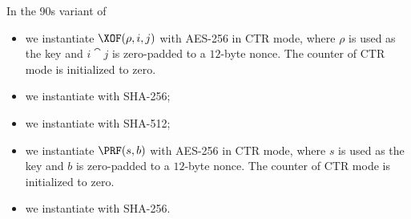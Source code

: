 In the 90s variant of \Kyber
\begin{itemize}
  \item we instantiate $\XOF(\rho,i,j)$ with AES-256 in CTR mode, where $\rho$ is used as the key and $i\cat j$ is zero-padded to a $12$-byte nonce.
    The counter of CTR mode is initialized to zero.
  \item we instantiate \ROH with SHA-256;
  \item we instantiate \ROG with SHA-512;
  \item we instantiate $\PRF(s,b)$ with AES-256 in CTR mode, where $s$ is used as the key and $b$ is zero-padded to a $12$-byte nonce.
    The counter of CTR mode is initialized to zero.
  \item we instantiate \KDF with SHA-256.
\end{itemize}
